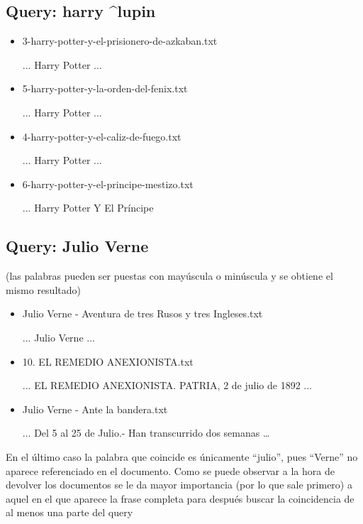 \documentclass[a4paper,12pt,]{article}
\begin{document}
\subsection*{Query: harry \^{}lupin}
\begin{itemize}
    \item 3-harry-potter-y-el-prisionero-de-azkaban.txt
    
    ... Harry Potter ...

    \item 5-harry-potter-y-la-orden-del-fenix.txt
    
    ... Harry Potter ...

    \item 4-harry-potter-y-el-caliz-de-fuego.txt
    
    ... Harry Potter ...

    \item 6-harry-potter-y-el-principe-mestizo.txt
    
    ... Harry Potter Y El Príncipe
\end{itemize}

\subsection*{Query: Julio Verne}
(las palabras pueden ser puestas con mayúscula o minúscula y se obtiene el mismo resultado)
\begin{itemize}
    \item Julio Verne - Aventura de tres Rusos y tres Ingleses.txt
    
    ... Julio Verne ...

    \item 10. EL REMEDIO ANEXIONISTA.txt
    
    ... EL REMEDIO ANEXIONISTA. PATRIA, 2 de julio de 1892 ...

    \item Julio Verne - Ante la bandera.txt 
    
    ... Del 5 al 25 de Julio.- Han transcurrido dos semanas …
\end{itemize}
En el último caso la palabra que coincide es únicamente “julio”, pues “Verne” no aparece referenciado en el documento. Como 
se puede observar a la hora de devolver los documentos se le da mayor importancia (por lo que sale primero) a aquel en el 
que aparece la frase completa para después buscar la coincidencia de al menos una parte del query
\end{document}
